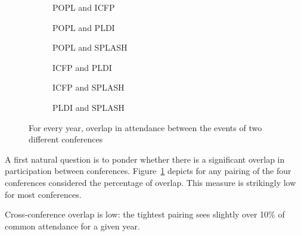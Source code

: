 \begin{figure}
  \centering
  \begin{subfigure}[b]{0.3\textwidth}
    \centering
    \caption{POPL and ICFP}
  \end{subfigure}
  \begin{subfigure}[b]{0.3\textwidth}
    \centering
    \caption{POPL and PLDI}
  \end{subfigure}
  \begin{subfigure}[b]{0.3\textwidth}
    \centering
    \caption{POPL and SPLASH}
  \end{subfigure}
  \begin{subfigure}[b]{0.3\textwidth}
    \centering
    \caption{ICFP and PLDI}
  \end{subfigure}
  \begin{subfigure}[b]{0.3\textwidth}
    \centering
    \caption{ICFP and SPLASH}
  \end{subfigure}
  \begin{subfigure}[b]{0.3\textwidth}
    \centering
    \caption{PLDI and SPLASH}
  \end{subfigure}
   \caption{For every year, overlap in attendance between the events of two
     different conferences}
  \label{fig:overlap-cross}
\end{figure}

A first natural question is to ponder whether there is a significant overlap
in participation between conferences.
Figure~\ref{fig:overlap-cross} depicts for any pairing of the four
conferences considered the percentage of overlap. This measure is strikingly
low for most conferences.

\begin{obs}
  Cross-conference overlap is low: the tightest pairing sees slightly over 10\%
  of common attendance for a given year.  
  \label{obs:overlap-cross}
\end{obs}

